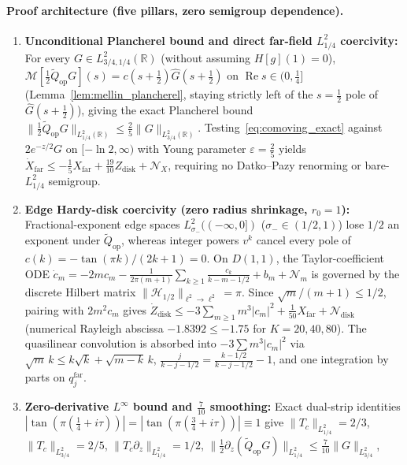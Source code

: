\documentclass[11pt,a4paper]{article}
\begin{document}
\paragraph{Proof architecture (five pillars, zero semigroup dependence).}
\begin{enumerate}
\item \textbf{Unconditional Plancherel bound and direct far-field $L^2_{1/4}$ coercivity:}
  For every $G\in L^2_{3/4,1/4}(\mathbb{R})$ (without assuming $H[g](1)=0$),
  $\mathcal{M}[\tfrac12\widetilde{Q}_{\mathrm{op}}G](s)=c(s+\tfrac12)\widehat{G}(s+\tfrac12)$ on
  $\operatorname{Re}s\in(0,\tfrac14]$ (Lemma~\ref{lem:mellin_plancherel}, staying strictly left of the $s=\tfrac12$ pole of $\widehat{G}(s+\tfrac12)$), giving the exact Plancherel bound
  $\|\tfrac12\widetilde{Q}_{\mathrm{op}}G\|_{L^2_{1/4}(\mathbb{R})}\le\frac{2}{5}\|G\|_{L^2_{3/4}(\mathbb{R})}$.
  Testing~\eqref{eq:comoving_exact} against $2e^{-z/2}G$ on $[-\ln 2,\infty)$ with Young parameter
  $\varepsilon=\frac{2}{5}$ yields $\dot X_{\mathrm{far}}\le -\frac{1}{5}X_{\mathrm{far}}+\frac{19}{10}Z_{\mathrm{disk}}+\mathcal{N}_X$,
  requiring no Datko--Pazy renorming or bare-$L^2_{1/4}$ semigroup.
\item \textbf{Edge Hardy-disk coercivity (zero radius shrinkage, $r_0=1$):}
  Fractional-exponent edge spaces $L^2_{\sigma_-}((-\infty,0])$ ($\sigma_-\in(1/2,1)$) lose $1/2$ an
  exponent under $\widetilde{Q}_{\mathrm{op}}$, whereas integer powers $v^k$ cancel every pole of
  $c(k)=-\tan(\pi k)/(2k+1)=0$. On $D(1,1)$, the Taylor-coefficient ODE
  $\dot c_m = -2m c_m - \frac{1}{2\pi(m+1)}\sum_{k\ge 1}\frac{c_k}{k-m-1/2} + b_m + \mathcal{N}_m$
  is governed by the discrete Hilbert matrix $\|\mathcal{H}_{1/2}\|_{\ell^2\to\ell^2} = \pi$.
  Since $\sqrt{m}/(m+1)\le 1/2$, pairing with $2m^2 c_m$ gives
  $\dot Z_{\mathrm{disk}} \le -3\sum_{m\ge 1} m^3|c_m|^2 + \frac{1}{50}X_{\mathrm{far}} + \mathcal{N}_{\mathrm{disk}}$
  (numerical Rayleigh abscissa $-1.8392\le -1.75$ for $K=20,40,80$).
  The quasilinear convolution is absorbed into $-3\sum m^3|c_m|^2$ via $\sqrt{m}\,k\le k\sqrt{k}+\sqrt{m-k}\,k$,
  $\frac{j}{k-j-1/2}=\frac{k-1/2}{k-j-1/2}-1$, and one integration by parts on $q_j^{\mathrm{far}}$.
\item \textbf{Zero-derivative $L^\infty$ bound and $\frac{7}{10}$ smoothing:}
  Exact dual-strip identities $|\tan(\pi(\frac{1}{4}+i\tau))|=|\tan(\pi(\frac{3}{4}+i\tau))|\equiv 1$
  give $\|T_c\|_{L^2_{1/4}}=2/3$, $\|T_c\|_{L^2_{3/4}}=2/5$, $\|T_c\partial_z\|_{L^2_{1/4}}=1/2$,
  $\|\frac{1}{2}\partial_z(\widetilde{Q}_{\mathrm{op}}G)\|_{L^2_{1/4}}\le \frac{7}{10}\|G\|_{L^2_{3/4}}$,

\end{enumerate}
\end{document}
